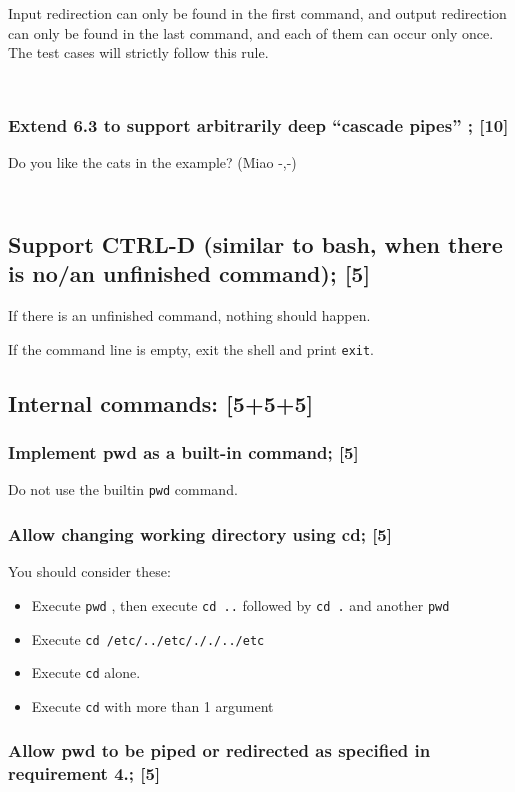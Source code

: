 \documentclass[11pt,a4paper]{article}
\newcommand{\example}[2]{
\begin{tcolorbox}[colback=blue!5!white,colframe=blue!75!black,title=Example (#1)]
\begin{minipage}{0.48\linewidth}
\inputminted{shell}{#2.in}
\end{minipage}
\begin{minipage}{0.48\linewidth}
\inputminted{shell}{#2.out}
\end{minipage}
\end{tcolorbox}
}
\begin{document}
Input redirection can only be found in the first command, and output redirection can only be found in the last command, and each of them can occur only once. The test cases will strictly follow this rule.\smallskip
\example{Milestone 2 Case 5}{../test/milestone2/case5}

\subsubsection{Extend 6.3 to support arbitrarily deep ``cascade pipes'' ; [10]}
Do you like the cats in the example? (Miao -,-) \smallskip
\example{Milestone 2 Case 8}{../test/milestone2/case8}

\subsection{Support CTRL-D (similar to bash, when there is no/an unfinished command); [5]}
If there is an unfinished command, nothing should happen. \smallskip

If the command line is empty, exit the shell and print \texttt{exit}.

\subsection{Internal commands: [5+5+5]}
\subsubsection{Implement pwd as a built-in command; [5]}
Do not use the builtin \texttt{pwd} command.

\subsubsection{Allow changing working directory using cd; [5]}
You should consider these:
\begin{itemize}
\item Execute \texttt{pwd} , then execute \texttt{cd ..} followed by \texttt{cd .} and another \texttt{pwd}
\item Execute \texttt{cd /etc/../etc/././../etc}
\item Execute \texttt{cd} alone.
\item Execute \texttt{cd} with more than 1 argument
\end{itemize}

\subsubsection{Allow pwd to be piped or redirected as specified in requirement 4.; [5]}
\end{document}

